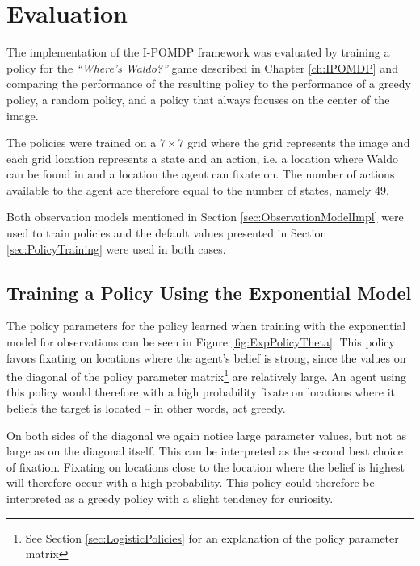 
\chapter{Evaluation}
\label{ch:Evaluation}
The implementation of the I-POMDP framework was evaluated by training a policy for the \emph{``Where's Waldo?''} game described in Chapter \ref{ch:IPOMDP} and comparing the performance of the resulting policy to the performance of a greedy policy, a random policy, and a policy that always focuses on the center of the image. 

The policies were trained on a $7 \times 7$ grid where the grid represents the image and each grid location represents a state and an action, i.e. a location where Waldo can be found in and a location the agent can fixate on. The number of actions available to the agent are therefore equal to the number of states, namely $49$.

Both observation models mentioned in Section \ref{sec:ObservationModelImpl} were used to train policies and the default values presented in Section \ref{sec:PolicyTraining} were used in both cases.

\section{Training a Policy Using the Exponential Model}
\label{sec:PolicyExp}
The policy parameters for the policy learned when training with the exponential model for observations can be seen in Figure \ref{fig:ExpPolicyTheta}. This policy favors fixating on locations where the agent's belief is strong, since the values on the diagonal of the policy parameter matrix\footnote{See Section \ref{sec:LogisticPolicies} for an explanation of the policy parameter matrix} are relatively large. An agent using this policy would therefore with a high probability fixate on locations where it beliefs the target is located -- in other words, act greedy.

On both sides of the diagonal we again notice large parameter values, but not as large as on the diagonal itself. This can be interpreted as the second best choice of fixation. Fixating on locations close to the location where the belief is highest will therefore occur with a high probability. This policy could therefore be interpreted as a greedy policy with a slight tendency for curiosity.

